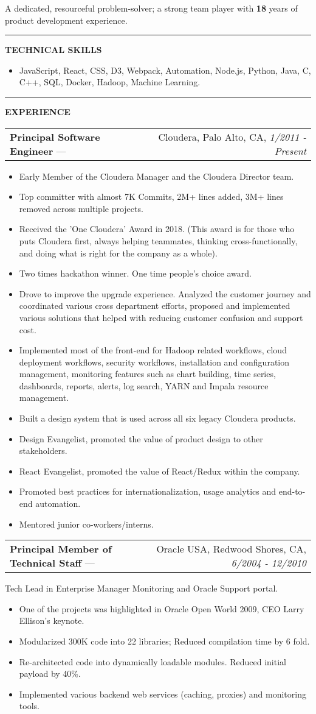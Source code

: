 \documentclass[11pt]{article}
\makeatletter
\newcommand{\resheading}[1]{\vspace{1pt}\textbf{#1}}
\newcommand{\ressubheading}[4]{\vspace{6pt}
    \begin{tabular*}{\textwidth}{@{}l@{\extracolsep{\fill}}r@{}}
        \textbf{#1} --- & #3, #2, \textit{#4} \\
\end{tabular*}}
\newcommand{\ressubsubheading}[1]{\vspace{6pt}#1}
\newcommand{\resitem}[1]{\item #1}
\newcommand{\ressep}{\vspace{6pt}\hrule\vspace{6pt}}
\makeatother
\begin{document}
A dedicated, resourceful problem-solver; a strong team player with \textbf{18} years of product development experience.

\ressep{}
\resheading{TECHNICAL SKILLS}
\begin{itemize}
\resitem{JavaScript, React, CSS, D3, Webpack, Automation, Node.js, Python, Java, C, C++, SQL, Docker, Hadoop, Machine Learning.}
\end{itemize}

\ressep{}
\resheading{EXPERIENCE}

\ressubheading{Principal Software Engineer}{Palo Alto, CA}{Cloudera}{1/2011 - Present}
\begin{itemize}
\resitem{Early Member of the Cloudera Manager and the Cloudera Director team.}
\resitem{Top committer with almost 7K Commits, 2M+ lines added, 3M+ lines removed across multiple projects.}
\resitem{Received the 'One Cloudera' Award in 2018. (This award is for those who puts Cloudera first, always helping teammates, thinking cross-functionally, and doing what is right for the company as a whole).}
\resitem{Two times hackathon winner. One time people's choice award.}
\resitem{Drove to improve the upgrade experience. Analyzed the customer journey and coordinated various cross department efforts, proposed and implemented various solutions that helped with reducing customer confusion and support cost.}
\resitem{Implemented most of the front-end for Hadoop related workflows, cloud deployment workflows, security workflows, installation and configuration management,
monitoring features such as chart building, time series, dashboards, reports, alerts, log search, YARN and Impala resource management.}
\resitem{Built a design system that is used across all six legacy Cloudera products.}
\resitem{Design Evangelist, promoted the value of product design to other stakeholders.}
\resitem{React Evangelist, promoted the value of React/Redux within the company.}
\resitem{Promoted best practices for internationalization, usage analytics and end-to-end automation.}
\resitem{Mentored junior co-workers/interns.}
\end{itemize}

\ressubheading{Principal Member of Technical Staff}{Redwood Shores, CA}{Oracle USA}{6/2004 - 12/2010}

\ressubsubheading{Tech Lead in Enterprise Manager Monitoring and Oracle Support portal.}

\begin{itemize}
\resitem{One of the projects was highlighted in Oracle Open World 2009, CEO Larry Ellison's keynote.}
\resitem{Modularized 300K code into 22 libraries; Reduced compilation time by 6 fold.}
\resitem{Re-architected code into dynamically loadable modules. Reduced initial payload by 40\%.}
\resitem{Implemented various backend web services (caching, proxies) and monitoring tools.}
\end{itemize}
\end{document}
